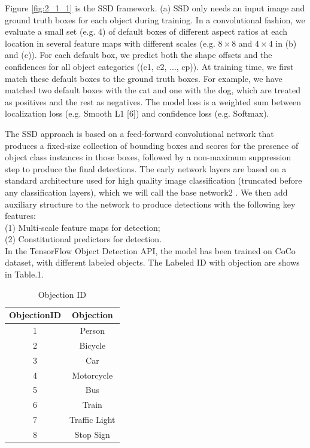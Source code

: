 \documentclass[10pt,twocolumn,letterpaper]{article}
\begin{document}
Figure \ref{fig:2_1_1} is the SSD framework. (a) SSD only needs an input image and ground truth boxes for each object during training. In a convolutional fashion, we evaluate a small set (e.g. 4) of default boxes of different aspect ratios at each location in several feature maps with different scales (e.g. $8 \times 8$ and $4 \times 4$ in (b) and (c)). For each default box, we predict both the shape offsets and the confidences for all object categories ((c1, c2, ...,  cp)). At training time, we first match these default boxes to the ground truth boxes. For example, we have matched two default boxes with the cat and one with the dog, which are treated as positives and the rest as negatives. The model loss is a weighted sum between localization loss (e.g. Smooth L1 [6]) and confidence loss (e.g. Softmax).

The SSD approach is based on a feed-forward convolutional network that produces
a fixed-size collection of bounding boxes and scores for the presence of object class
instances in those boxes, followed by a non-maximum suppression step to produce the
final detections. The early network layers are based on a standard architecture used for
high quality image classification (truncated before any classification layers), which we
will call the base network2
. We then add auxiliary structure to the network to produce
detections with the following key features:
\\(1) Multi-scale feature maps for detection;
\\(2) Constitutional predictors for detection.
\\ 
In the TensorFlow Object Detection API, the model has been trained on CoCo dataset, with different labeled objects. The Labeled ID with objection are shows in Table.1. \\

\begin{table}
\begin{center}
\begin{tabular}{|c|c|}
\hline
ObjectionID & Objection \\
\hline\hline
1 & Person \\
\hline
2 & Bicycle \\
\hline
3 & Car\\
\hline
4 & Motorcycle\\
\hline
5 &Bus \\
\hline
6 & Train \\
\hline
7 & Traffic Light \\
\hline
8 & Stop Sign \\
\hline
\end{tabular}
\end{center}
\caption{Objection ID}
\end{table}
\end{document}
